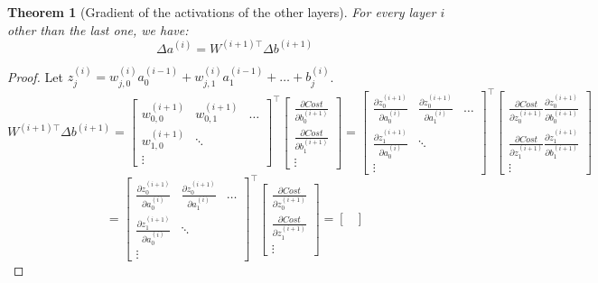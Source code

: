 \documentclass{article}
\newtheorem{theorem}{Theorem}[section]
\theoremstyle{definition}
\theoremstyle{remark}
\theoremstyle{example}
\begin{document}
\begin{theorem}[Gradient of the activations of the other layers]
    For every layer $i$ other than the last one, we have:
        $$\Delta a^{(i)} = W^{(i+1)\top} \Delta b^{(i+1)}$$
\end{theorem}

\begin{proof}
    Let $z^{(i)}_j = w_{j,0}^{(i)} a_0^{(i-1)} + w_{j,1}^{(i)} a_1^{(i-1)} + \dots + b_j^{(i)}$.
$$W^{(i+1)\top} \Delta b^{(i+1)} =
\begin{bmatrix}
    w_{0,0}^{(i+1)} & w_{0,1}^{(i+1)} & \dots\\
    w_{1,0}^{(i+1)} & \ddots\\
    \vdots
\end{bmatrix}^\top
\begin{bmatrix}
    \frac{\partial Cost}{\partial b_0^{(i+1)}}\\
    \frac{\partial Cost}{\partial b_1^{(i+1)}}\\
    \vdots
\end{bmatrix}
= \begin{bmatrix}
    \frac{\partial z^{(i+1)}_0}{\partial a^{(i)}_0} & \frac{\partial z^{(i+1)}_0}{\partial a^{(i)}_1} & \dots\\
    \frac{\partial z^{(i+1)}_1}{\partial a^{(i)}_0} & \ddots\\
    \vdots
\end{bmatrix}^\top
\begin{bmatrix}
    \frac{\partial Cost}{\partial z^{(i+1)}_0} \frac{\partial z^{(i+1)}_0}{\partial b_0^{(i+1)}}\\
    \frac{\partial Cost}{\partial z^{(i+1)}_1} \frac{\partial z^{(i+1)}_1}{\partial b_1^{(i+1)}}\\
    \vdots
\end{bmatrix}$$
$$= \begin{bmatrix}
    \frac{\partial z^{(i+1)}_0}{\partial a^{(i)}_0} & \frac{\partial z^{(i+1)}_0}{\partial a^{(i)}_1} & \dots\\
    \frac{\partial z^{(i+1)}_1}{\partial a^{(i)}_0} & \ddots\\
    \vdots
\end{bmatrix}^\top
\begin{bmatrix}
    \frac{\partial Cost}{\partial z^{(i+1)}_0}\\
    \frac{\partial Cost}{\partial z^{(i+1)}_1}\\
    \vdots
\end{bmatrix}
=\begin{bmatrix}

\end{bmatrix}$$
\end{proof}
\end{document}
